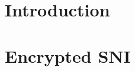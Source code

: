\documentclass[twoside]{article}
\theoremstyle{definition}
\begin{document}
\begin{comment}
# Notes
- Assume that application data transfer leaks nothing about the service.

bindings: cast in terms of contexts (transcripts)
Backward binding: integrity for ClientHello
Forward binding: 
- want to detect deletion of SNI
- proxy needs DH secrets to determine the right transcript -- can't be two entities on the client side
- could treat origin padding as a configuration
- GeneraetSH must be done at the proxy, and not based on origin servers. Can get away with unmodified servers (modulo template)
- GeneraetCH/SH are the baseline properties -- show that adding forward/backward binding keeps existing properties while giving new properties
  - These may be determined by checkboxes. If any two F's are the same, then the privacy properties hold.
  - Q: should ACME be issuing certificates of a certain length

- flipping bits in CH should cause handshake keys to differ (Kazuho's does NOT do this, and there's an oracle at the client handshake)
- always need backwards binding (for messages, but possibly based on the entire transcript?)
- kazuho: enumerate domains and trial decrypt based on all possible transcripts

What we want to hide:
- SNI value itself
- A connection negotiated ESNI
- Whether the ESNI capability
- Whether the client offered ESNI

Requirements:
1. TLS agrees on SNI (forward binding, native to TLS)
2. TLS+ESNI gives us (1) and protects SNI privacy (backward binding)
  - 1/k anonymity, without forward secrecy

Optional:
3. TLS+ESNI gives (1-2) and protects the fact that ESNI was chosen
4. TLS+ESNI (1-3), plus whether the client offered ESNI


\end{comment}

\section{Introduction}


\section{Encrypted SNI}
\end{document}
